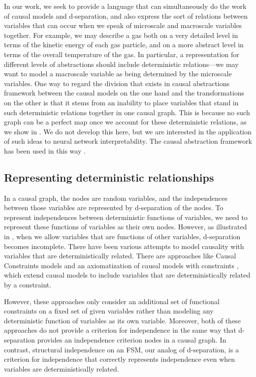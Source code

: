 \documentclass[USenglish,onecolumn]{article}
\begin{document}
In our work, we seek to provide a language that can simultaneously do the work of causal models and d-separation, and also express the sort of relations between variables that can occur when we speak of microscale and macroscale variables together. For example, we may describe a gas both on a very detailed level in terms of the kinetic energy of each gas particle, and on a more abstract level in terms of the overall temperature of the gas. 
In particular, a representation for different levels of abstractions should include deterministic relations---we may want to model a macroscale variable as being determined by the microscale variables.
One way to regard the division that exists in causal abstractions framework between the causal models on the one hand and the transformations on the other is that it stems from an inability to place variables that stand in such deterministic relations together in one causal graph.
This is because no such graph can be a perfect map once we account for these deterministic relations, as we show in .
We do not develop this here, but we are interested in the application of such ideas to neural network interpretability. The causal abstraction framework has been used in this way \cite{geiger2021causal} \cite{geiger2023causal}.

\subsection{Representing deterministic relationships}
In a causal graph, the nodes are random variables, and the independences between those variables are represented by d-separation of the nodes. To represent independences between deterministic functions of variables, we need to represent these functions of variables as their own nodes. However, as illustrated in , when we allow variables that are functions of other variables, d-separation becomes incomplete. There have been various attempts to model causality with variables that are deterministically related. There are approaches like Causal Constraints models \cite{blom2020beyond} and an axiomatization of causal models with constraints \cite{beckers2023causal}, which extend causal models to include variables that are deterministically related by a constraint.

However, these approaches only consider an additional set of functional constraints on a fixed set of given variables rather than modeling any deterministic function of variables as its own variable. Moreover, both of these approaches do not provide a criterion for independence in the same way that d-separation provides an independence criterion nodes in a causal graph. 
In contrast, structural independence on an FSM, our analog of d-separation, is a criterion for independence that correctly represents independence even when variables are deterministically related.
\end{document}
